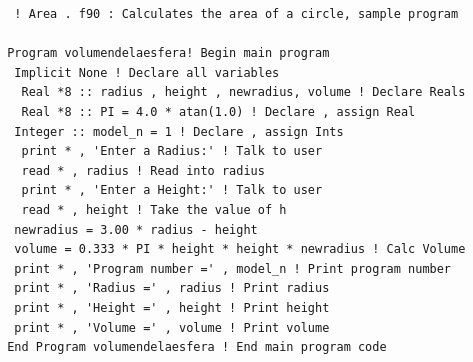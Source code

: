 \documentclass[12pt]{article}
\begin{document}
\begin{itemize}
\begin{center}
\end{center}
  \begin{verbatim}
  ! Area . f90 : Calculates the area of a circle, sample program
 
 Program volumendelaesfera! Begin main program
  Implicit None ! Declare all variables
   Real *8 :: radius , height , newradius, volume ! Declare Reals
   Real *8 :: PI = 4.0 * atan(1.0) ! Declare , assign Real
  Integer :: model_n = 1 ! Declare , assign Ints
   print * , 'Enter a Radius:' ! Talk to user
   read * , radius ! Read into radius
   print * , 'Enter a Height:' ! Talk to user
   read * , height ! Take the value of h
  newradius = 3.00 * radius - height 
  volume = 0.333 * PI * height * height * newradius ! Calc Volume
  print * , 'Program number =' , model_n ! Print program number
  print * , 'Radius =' , radius ! Print radius
  print * , 'Height =' , height ! Print height
  print * , 'Volume =' , volume ! Print volume
 End Program volumendelaesfera ! End main program code
  
  \end{verbatim}
 
 
\end{itemize}
\end{document}
